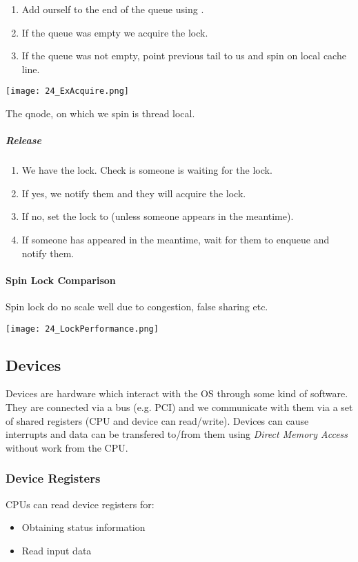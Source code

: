 \begin{enumerate}
    \item Add ourself to the end of the queue using .
    \item If the queue was empty we acquire the lock.
    \item If the queue was not empty, point previous tail to us and spin on local cache line.
\end{enumerate}

\texttt{[image: 24\_ExAcquire.png]}

The qnode, on which we spin is thread local.

\subparagraph{Release}
\begin{enumerate}
    \item We have the lock. Check is someone is waiting for the lock.
    \item If yes, we notify them and they will acquire the lock.
    \item If no, set the lock to  (unless someone appears in the meantime).
    \item If someone has appeared in the meantime, wait for them to enqueue and notify them.
\end{enumerate}

\paragraph{Spin Lock Comparison}
Spin lock do no scale well due to congestion, false sharing etc. 

\texttt{[image: 24\_LockPerformance.png]}

\subsection*{Devices}
Devices are hardware which interact with the OS through some kind of software. They are connected via a bus (e.g. PCI) and we communicate with them via a set of shared registers (CPU and device can read/write). Devices can cause interrupts and data can be transfered to/from them using \textit{Direct Memory Access} without work from the CPU.

\subsubsection{Device Registers}
CPUs can read device registers for:

\begin{itemize}
    \item Obtaining status information
    \item Read input data
\end{itemize}

